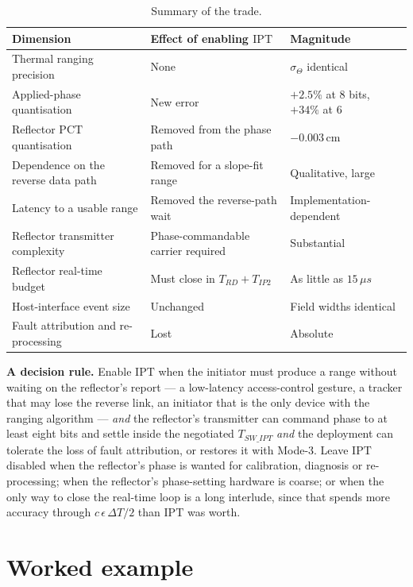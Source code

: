 \documentclass[11pt,a4paper]{article}
\newcommand{\us}{\,\ensuremath{\upmu}s}
\newcommand{\PCT}{\ensuremath{\mathrm{PCT}}}
\newcommand{\IPT}{\ensuremath{\mathrm{IPT}}}
\newcommand{\Tswipt}{T_{SW\_IPT}}
\newcommand{\Trd}{T_{RD}}
\newcommand{\Tiptwo}{T_{IP2}}
\providecommand{\upmu}{\mu}
\begin{document}
\begin{table}[h]
\caption{Summary of the trade.}
\label{tab:trade}
\centering\small
\begin{tabular}{@{}L{46mm}L{40mm}L{44mm}@{}}
\toprule
Dimension & Effect of enabling \IPT & Magnitude \\
\midrule
Thermal ranging precision & None & $\sigma_\Theta$ identical \\
Applied-phase quantisation & New error & $+2.5\%$ at 8 bits, $+34\%$ at 6 \\
Reflector $\PCT$ quantisation & Removed from the phase path & $-0.003$\,cm \\
Dependence on the reverse data path & Removed for a slope-fit range & Qualitative, large \\
Latency to a usable range & Removed the reverse-path wait & Implementation-dependent \\
Reflector transmitter complexity & Phase-commandable carrier required & Substantial \\
Reflector real-time budget & Must close in $\Trd+\Tiptwo$ & As little as $15\us$ \\
Host-interface event size & Unchanged & Field widths identical \\
Fault attribution and re-processing & Lost & Absolute \\
\bottomrule
\end{tabular}
\end{table}

\begin{callout}
\textbf{A decision rule.} Enable \IPT{} when the initiator must produce a range without waiting on
the reflector's report --- a low-latency access-control gesture, a tracker that may lose the reverse
link, an initiator that is the only device with the ranging algorithm --- \emph{and} the reflector's
transmitter can command phase to at least eight bits and settle inside the negotiated $\Tswipt$
\emph{and} the deployment can tolerate the loss of fault attribution, or restores it with Mode-3.
Leave \IPT{} disabled when the reflector's phase is wanted for calibration, diagnosis or
re-processing; when the reflector's phase-setting hardware is coarse; or when the only way to close
the real-time loop is a long interlude, since that spends more accuracy through
$c\,\epsilon\,\Delta T/2$ than \IPT{} was worth.
\end{callout}

\section{Worked example}
\label{sec:example}
\end{document}
